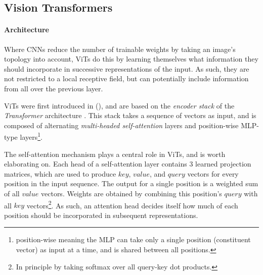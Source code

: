 

\subsection{Vision Transformers} \label{vits}
\paragraph{Architecture}
Where CNNs reduce the number of trainable weights by taking an image's topology into account, ViTs do this by learning themselves what information they should incorporate in successive representations of the input. As such, they are not restricted to a local receptive field, but can potentially include information from all over the previous layer.

ViTs were first introduced in \citeauthor{dosovitskiy2020image} (\citeyear{dosovitskiy2020image}), and are based on the \textit{encoder stack} of the \textit{Transformer} architecture \citep{vaswani2017attention}. This stack takes a sequence of vectors as input, and is composed of alternating \textit{multi-headed self-attention} layers and position-wise MLP-type layers\footnote{position-wise meaning the MLP can take only a single position (constituent vector) as input at a time, and is shared between all positions.}.

The self-attention mechanism plays a central role in ViTs, and is worth elaborating on. Each head of a self-attention layer contains 3 learned projection matrices, which are used to produce $key$, $value$, and $query$ vectors for every position in the input sequence. The output for a single position is a weighted sum of all $value$ vectors. Weights are obtained by combining this position's $query$ with all $key$ vectors\footnote{In principle by taking softmax over all query-key dot products.}. As such, an attention head decides itself how much of each position should be incorporated in subsequent representations.


